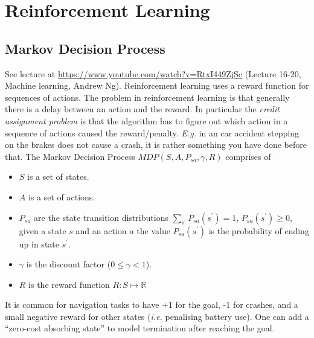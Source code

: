 \documentclass{article}
\begin{document}
\section{Reinforcement Learning}
\subsection{Markov Decision Process}
See lecture at \url{https://www.youtube.com/watch?v=RtxI449ZjSc} (Lecture 16-20, Machine learning, Andrew Ng).
Reinforcement learning uses a reward function for sequences of actions.
The problem in reinforcement learning is that generally there is a delay between an action and the reward.
In particular the \emph{credit assignment problem} is that the algorithm has to figure out
which action in a sequence of actions caused the reward/penalty.
\emph{E.g.} in an car accident stepping on the brakes does not cause a crash, it is rather something you have done before that.
The Markov Decision Process $MDP(S,A,P_{sa},\gamma,R)$ comprises of
\begin{itemize}
  \item $S$ is a set of states.
  \item $A$ is a set of actions.
  \item $P_{sa}$ are the state transition distributions $\sum_{s^\prime} P_{sa}(s^\prime)=1$, $P_{sa}(s^\prime)\ge 0$,
    given a state $s$ and an action $a$ the value $P_{sa}(s^\prime)$ is the probability of ending up in state $s^\prime$.
  \item $\gamma$ is the discount factor ($0 \le \gamma < 1$).
  \item $R$ is the reward function $R : S \mapsto \mathbb{R}$
\end{itemize}
It is common for navigation tasks to have +1 for the goal, -1 for crashes,
and a small negative reward for other states (\emph{i.e.} penalising battery use).
One can add a ``zero-cost absorbing state'' to model termination after reaching the goal.
\end{document}
